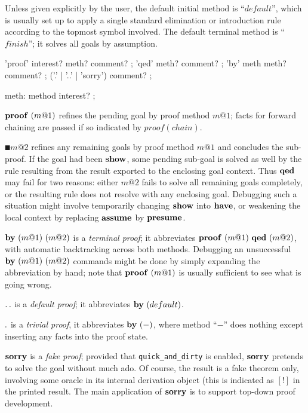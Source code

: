 \medskip

Unless given explicitly by the user, the default initial method is
``$default$'', which is usually set up to apply a single standard elimination
or introduction rule according to the topmost symbol involved.  The default
terminal method is ``$finish$''; it solves all goals by assumption.

\begin{rail}
  'proof' interest? meth? comment?
  ;
  'qed' meth? comment?
  ;
  'by' meth meth? comment?
  ;
  ('.' | '..' | 'sorry') comment?
  ;

  meth: method interest?
  ;
\end{rail}

\begin{descr}
\item [$\PROOF{m@1}$] refines the pending goal by proof method $m@1$; facts
  for forward chaining are passed if so indicated by $proof(chain)$.
\item [$\QED{m@2}$] refines any remaining goals by proof method $m@1$ and
  concludes the sub-proof.  If the goal had been ${\mathord{\mathbf{show}}}$, some pending
  sub-goal is solved as well by the rule resulting from the result exported to
  the enclosing goal context.  Thus ${\mathord{\mathbf{qed}}}$ may fail for two reasons:
  either $m@2$ fails to solve all remaining goals completely, or the resulting
  rule does not resolve with any enclosing goal.  Debugging such a situation
  might involve temporarily changing ${\mathord{\mathbf{show}}}$ into ${\mathord{\mathbf{have}}}$, or
  weakening the local context by replacing ${\mathord{\mathbf{assume}}}$ by ${\mathord{\mathbf{presume}}}$.
\item [$\BYY{m@1}{m@2}$] is a \emph{terminal proof}; it abbreviates
  $\PROOF{m@1}~\QED{m@2}$, with automatic backtracking across both methods.
  Debugging an unsuccessful $\BYY{m@1}{m@2}$ commands might be done by simply
  expanding the abbreviation by hand; note that $\PROOF{m@1}$ is usually
  sufficient to see what is going wrong.
\item [${\mathord{\mathbf{.\,.}}}$] is a \emph{default proof}; it abbreviates $\BY{default}$.
\item [${\mathord{\mathbf{.}}}$] is a \emph{trivial proof}, it abbreviates $\BY{-}$, where
  method ``$-$'' does nothing except inserting any facts into the proof state.
\item [${\mathord{\mathbf{sorry}}}$] is a \emph{fake proof}; provided that
  \texttt{quick_and_dirty} is enabled, ${\mathord{\mathbf{sorry}}}$ pretends to solve
  the goal without much ado.  Of course, the result is a fake theorem only,
  involving some oracle in its internal derivation object (this is indicated
  as $[!]$ in the printed result.  The main application of
  ${\mathord{\mathbf{sorry}}}$ is to support top-down proof development.
\end{descr}


